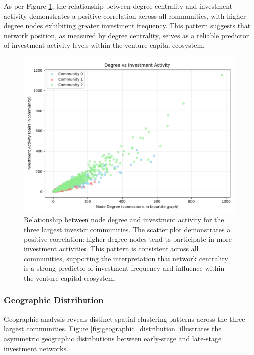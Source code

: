 As per Figure \ref{fig:degree_vs_activity}, the relationship between degree centrality and investment activity demonstrates a positive correlation across all communities, with higher-degree nodes exhibiting greater investment frequency. This pattern suggests that network position, as measured by degree centrality, serves as a reliable predictor of investment activity levels within the venture capital ecosystem.


\begin{figure}[htpb]
\centering
\includegraphics[width=1\textwidth]{./assets/degree_vs_investment.png}
\caption{Relationship between node degree and investment activity for the three largest investor communities. The scatter plot demonstrates a positive correlation: higher-degree nodes tend to participate in more investment activities. This pattern is consistent across all communities, supporting the interpretation that network centrality is a strong predictor of investment frequency and influence within the venture capital ecosystem.}
\label{fig:degree_vs_activity}
\end{figure}

\subsubsection{Geographic Distribution}

Geographic analysis reveals distinct spatial clustering patterns across the three largest communities. Figure \ref{fig:geographic_distribution} illustrates the asymmetric geographic distributions between early-stage and late-stage investment networks.

